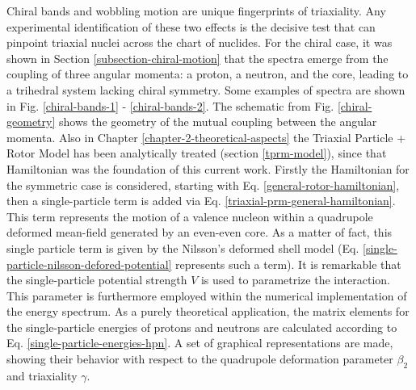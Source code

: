 Chiral bands and wobbling motion are unique fingerprints of triaxiality. Any experimental identification of these two effects is the decisive test that can pinpoint triaxial nuclei across the chart of nuclides. For the chiral case, it was shown in Section \ref{subsection-chiral-motion} that the spectra emerge from the coupling of three angular momenta: a proton, a neutron, and the core, leading to a trihedral system lacking chiral symmetry. Some examples of spectra are shown in Fig. \ref{chiral-bands-1} - \ref{chiral-bands-2}. The schematic from Fig. \ref{chiral-geometry} shows the geometry of the mutual coupling between the angular momenta. Also in Chapter \ref{chapter-2-theoretical-aspects} the Triaxial Particle + Rotor Model has been analytically treated (section \ref{tprm-model}), since that Hamiltonian was the foundation of this current work. Firstly the Hamiltonian for the symmetric case is considered, starting with Eq. \eqref{general-rotor-hamiltonian}, then a single-particle term is added via Eq. \eqref{triaxial-prm-general-hamiltonian}. This term represents the motion of a valence nucleon within a quadrupole deformed mean-field generated by an even-even core. As a matter of fact, this single particle term is given by the Nilsson's deformed shell model (Eq. \eqref{single-particle-nilsson-defored-potential} represents such a term). It is remarkable that the single-particle potential strength $V$ is used to parametrize the interaction. This parameter is furthermore employed within the numerical implementation of the energy spectrum. As a purely theoretical application, the matrix elements for the single-particle energies of protons and neutrons are calculated according to Eq. \eqref{single-particle-energies-hpn}. A set of graphical representations are made, showing their behavior with respect to the quadrupole deformation parameter $\beta_2$ and triaxiality $\gamma$. 

